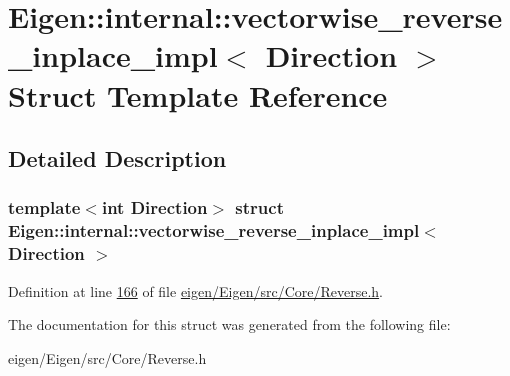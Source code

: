 \hypertarget{struct_eigen_1_1internal_1_1vectorwise__reverse__inplace__impl}{}\section{Eigen\+:\+:internal\+:\+:vectorwise\+\_\+reverse\+\_\+inplace\+\_\+impl$<$ Direction $>$ Struct Template Reference}
\label{struct_eigen_1_1internal_1_1vectorwise__reverse__inplace__impl}


\subsection{Detailed Description}
\subsubsection*{template$<$int Direction$>$\newline
struct Eigen\+::internal\+::vectorwise\+\_\+reverse\+\_\+inplace\+\_\+impl$<$ Direction $>$}



Definition at line \hyperlink{eigen_2_eigen_2src_2_core_2_reverse_8h_source_l00166}{166} of file \hyperlink{eigen_2_eigen_2src_2_core_2_reverse_8h_source}{eigen/\+Eigen/src/\+Core/\+Reverse.\+h}.



The documentation for this struct was generated from the following file\+:\begin{DoxyCompactItemize}
\item 
eigen/\+Eigen/src/\+Core/\+Reverse.\+h\end{DoxyCompactItemize}
